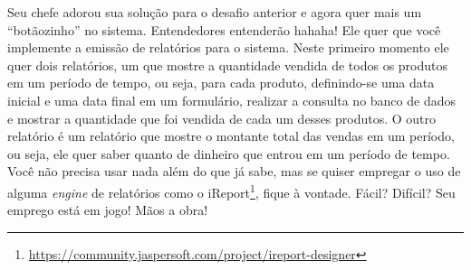 \begin{desafioSemArquivo}{}{}{}
    Seu chefe adorou sua solução para o desafio anterior e agora quer mais um ``botãozinho'' no sistema. Entendedores entenderão hahaha! Ele quer que você implemente a emissão de relatórios para o sistema. Neste primeiro momento ele quer dois relatórios, um que mostre a quantidade vendida de todos os produtos em um período de tempo, ou seja, para cada produto, definindo-se uma data inicial e uma data final em um formulário, realizar a consulta no banco de dados e mostrar a quantidade que foi vendida de cada um desses produtos. O outro relatório é um relatório que mostre o montante total das vendas em um período, ou seja, ele quer saber quanto de dinheiro que entrou em um período de tempo. Você não precisa usar nada além do que já sabe, mas se quiser empregar o uso de alguma \textit{engine} de relatórios como o iReport\footnote{\url{https://community.jaspersoft.com/project/ireport-designer}}, fique à vontade. Fácil? Difícil? Seu emprego está em jogo! Mãos a obra!
\end{desafioSemArquivo}